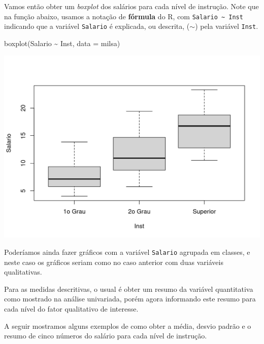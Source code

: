 \documentclass[
  10pt,
  a4paper]{book}
\newenvironment{Shaded}{\begin{snugshade}}{\end{snugshade}}
\newcommand{\AttributeTok}[1]{\textcolor[rgb]{0.77,0.63,0.00}{#1}}
\newcommand{\FunctionTok}[1]{\textcolor[rgb]{0.00,0.00,0.00}{#1}}
\newcommand{\NormalTok}[1]{#1}
\newcommand{\SpecialCharTok}[1]{\textcolor[rgb]{0.00,0.00,0.00}{#1}}
\begin{document}
Vamos então obter um \emph{boxplot} dos salários para cada nível de
instrução. Note que na função abaixo, usamos a notação de \textbf{fórmula} do
R, com \texttt{Salario\ \textasciitilde{}\ Inst} indicando que a variável \texttt{Salario} é explicada,
ou descrita, (\(\sim\)) pela variável \texttt{Inst}.

\begin{Shaded}
\begin{Highlighting}[]
\FunctionTok{boxplot}\NormalTok{(Salario }\SpecialCharTok{\textasciitilde{}}\NormalTok{ Inst, }\AttributeTok{data =}\NormalTok{ milsa)}
\end{Highlighting}
\end{Shaded}

\begin{center}\includegraphics{figures/unnamed-chunk-319-1} \end{center}

Poderíamos ainda fazer gráficos com a variável \texttt{Salario} agrupada
em classes, e neste caso os gráficos seriam como no caso anterior com
duas variáveis qualitativas.

Para as medidas descritivas, o usual é obter um resumo da variável
quantitativa como mostrado na análise univariada, porém agora informando
este resumo para cada nível do fator qualitativo de interesse.

A seguir mostramos alguns exemplos de como obter a média, desvio
padrão e o resumo de cinco números do salário para cada nível de
instrução.
\end{document}
